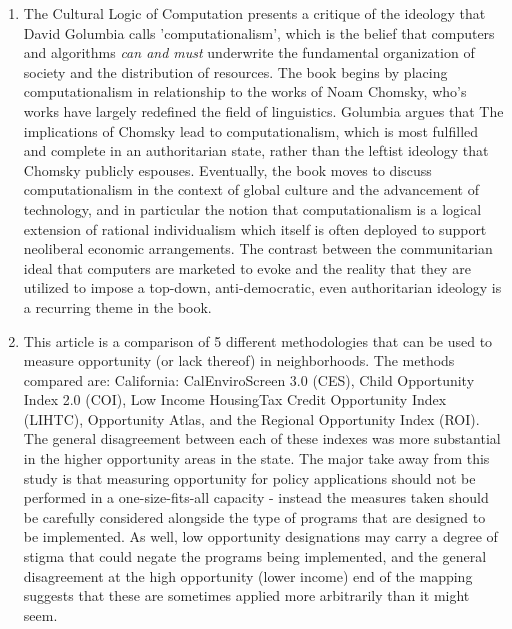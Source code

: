 \documentclass{article}
\begin{document}
\begin{enumerate}
\item \cite{golumbia2009CulturalLogic}

The Cultural Logic of Computation presents a critique of the ideology
that David Golumbia calls 'computationalism', which is the belief that
computers and algorithms \emph{can and must} underwrite the
fundamental organization of society and the distribution of
resources. The book begins by placing computationalism in relationship
to the works of Noam Chomsky, who's works have largely redefined the
field of linguistics. Golumbia argues that The implications of Chomsky
lead to computationalism, which is most fulfilled and complete in an
authoritarian state, rather than the leftist ideology that Chomsky
publicly espouses. Eventually, the book moves to discuss
computationalism in the context of global culture and the advancement
of technology, and in particular the notion that computationalism is a
logical extension of rational individualism which itself is often
deployed to support neoliberal economic arrangements. The contrast
between the communitarian ideal that computers are marketed to evoke
and the reality that they are utilized to impose a top-down,
anti-democratic, even authoritarian ideology is a recurring theme in
the book.


\item \cite{brazil2022MeasuringMapping} This article is a comparison
  of 5 different methodologies that can be used to measure opportunity
  (or lack thereof) in neighborhoods. The methods compared are:
  California: CalEnviroScreen 3.0 (CES), Child Opportunity Index 2.0
  (COI), Low Income HousingTax Credit Opportunity Index (LIHTC),
  Opportunity Atlas, and the Regional Opportunity Index (ROI). The
  general disagreement between each of these indexes was more
  substantial in the higher opportunity areas in the state. The major
  take away from this study is that measuring opportunity for policy
  applications should not be performed in a one-size-fits-all capacity
  - instead the measures taken should be carefully considered
  alongside the type of programs that are designed to be
  implemented. As well, low opportunity designations may carry a
  degree of stigma that could negate the programs being implemented,
  and the general disagreement at the high opportunity (lower income)
  end of the mapping suggests that these are sometimes applied more
  arbitrarily than it might seem.


\end{enumerate}
\end{document}
